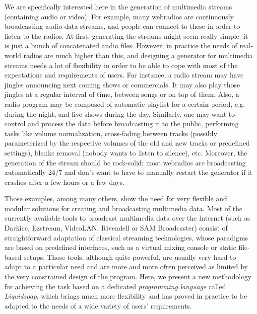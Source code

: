 \documentclass{llncs}
\newcommand{\eg}{{e.g.}}
\begin{document}
We are specifically interested here in the generation of multimedia streams
(containing audio or video). For example, many webradios are continuously
broadcasting audio data streams, and people can connect to these in order to
listen to the radios. At first, generating the streams might seem really simple:
it is just a bunch of concatenated audio files. However, in practice the needs
of real-world radios are much higher than this, and designing a generator for
multimedia streams needs a lot of flexibility in order to be able to cope with
most of the expectations and requirements of users. For instance, a radio stream
may have jingles announcing next coming shows or commercials. It may also play
those jingles at a regular interval of time, between songs or on top of
them. Also, a radio program may be composed of automatic playlist for a certain
period, \eg{} during the night, and live shows during the day. Similarly, one
may want to control and process the data before broadcasting it to the public,
performing tasks like volume normalization, cross-fading between tracks
(possibly parameterized by the respective volumes of the old and new tracks or
predefined settings), blanks removal (nobody wants to listen to silence),
etc. Moreover, the generation of the stream should be rock-solid: most webradios
are broadcasting automatically 24/7 and don't want to have to manually restart
the generator if it crashes after a few hours or a few days.

Those examples, among many others, show the need for very flexible and modular
solutions for creating and broadcasting multimedia data. Most of the currently
available tools to broadcast multimedia data over the Internet (such as Darkice,
Ezstream, VideoLAN, Rivendell or SAM Broadcaster) consist of straightforward
adaptation of classical streaming technologies, whose paradigms are based on
predefined interfaces, such as a virtual mixing console or static file-based
setups. Those tools, although quite powerful, are usually very hard to adapt to
a particular need and are more and more often perceived as limited by the very
constrained design of the program. Here, we present a new methodology for
achieving the task based on a dedicated \emph{programming language} called
\emph{Liquidsoap}, which brings much more flexibility and has proved in practice
to be adapted to the needs of a wide variety of users' requirements.
\end{document}
